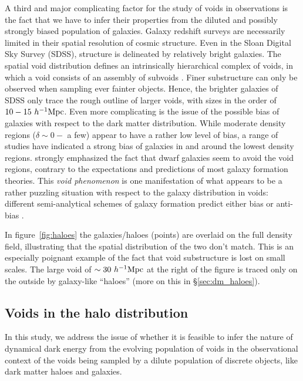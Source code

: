 A third and major complicating factor for the study of voids in observations is the fact that we have to infer 
their properties from the diluted and possibly strongly biased population of galaxies.
Galaxy redshift surveys are necessarily limited in their spatial resolution of cosmic 
structure. Even in the Sloan Digital Sky Survey (SDSS), structure is delineated by relatively bright galaxies. The 
spatial void distribution defines an intrinsically hierarchical complex of voids, in which a void consists 
of an assembly of subvoids \citep{sahni94, sheth04, aragon10, aragon12}. Finer substructure can only be observed 
when sampling ever fainter objects. Hence, the brighter galaxies of SDSS only trace the rough outline of 
larger voids, with sizes in the order of $10-15~h^{-1} {\rm Mpc}$. Even more complicating is the issue of the possible 
bias of galaxies with respect to the dark matter distribution. While moderate density regions ($\delta\sim 0-$ a few) 
appear to have 
a rather low level of bias, a range of studies have indicated a strong 
bias of galaxies in and around the lowest density regions. \citet{peebles02} strongly emphasized the fact that 
dwarf galaxies seem to avoid the void regions, contrary to the expectations and predictions of most galaxy 
formation theories. This \textit{void phenomenon} is one manifestation of what appears to be a 
rather puzzling situation with respect to the galaxy distribution in voids: different semi-analytical schemes of 
galaxy formation predict either bias or anti-bias \citep{platenphd,platen12}. 

In figure~\ref{fig:haloes} the galaxies/haloes (points) are overlaid on the full density field, illustrating that 
the spatial distribution of the two don't match. This is an especially poignant example of the fact that void substructure 
is lost on small scales. The large void of $\sim 30 ~h^{-1} {\rm Mpc}$ at the right of the figure is traced only on the outside by 
galaxy-like ``haloes'' (more on this in \S\ref{sec:dm_haloes}).

\subsection{Voids in the halo distribution}
\label{sec:voidhalo}
In this study, we address the issue of whether it is feasible to infer the nature of dynamical dark energy 
from the evolving population of voids in the observational context of the voids being sampled by a dilute 
population of discrete objects, like dark matter haloes and galaxies. 

